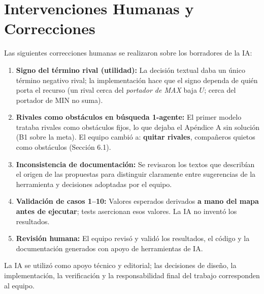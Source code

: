 \section{Intervenciones Humanas y Correcciones}
\label{sec:intervenciones-humanas}

Las siguientes correcciones humanas se realizaron sobre los borradores de la IA:

\begin{enumerate}
\item \textbf{Signo del término rival (utilidad):} La decisión textual daba un único término
  negativo rival; la implementación hace que el signo dependa de quién porta el recurso
  (un rival cerca del \textit{portador de MAX} baja $U$; cerca del portador de MIN no suma).
\item \textbf{Rivales como obstáculos en búsqueda 1-agente:} El primer modelo trataba rivales
  como obstáculos fijos, lo que dejaba el Apéndice A sin solución (B1 sobre la meta). El
  equipo cambió a: \textbf{quitar rivales}, compañeros quietos como obstáculos (Sección 6.1).
\item \textbf{Inconsistencia de documentación:} Se revisaron los textos que describían el
  origen de las propuestas para distinguir claramente entre sugerencias de la herramienta
  y decisiones adoptadas por el equipo.
\item \textbf{Validación de casos 1--10:} Valores esperados derivados \textbf{a mano del mapa
  antes de ejecutar}; tests asercionan esos valores. La IA no inventó los resultados.
\item \textbf{Revisión humana:} El equipo revisó y validó los resultados, el código y la
  documentación generados con apoyo de herramientas de IA.
\end{enumerate}

La IA se utilizó como apoyo técnico y editorial; las decisiones de diseño, la
implementación, la verificación y la responsabilidad final del trabajo corresponden al
equipo.